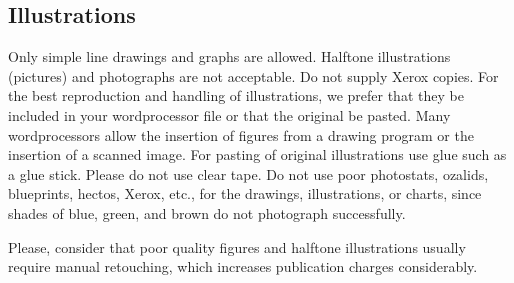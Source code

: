 \subsection{Illustrations}
Only simple line drawings and graphs are allowed.
Halftone illustrations (pictures) and photographs
are not acceptable. Do not supply Xerox copies.
For the best reproduction and handling of illustrations, we prefer
that they be included in your wordprocessor file or that the
original be pasted.  Many wordprocessors allow the insertion
of figures from a drawing program or the insertion of a
scanned image.  For pasting of original illustrations use glue
such as a glue stick.  Please do not use clear tape.  Do not
use poor photostats, ozalids, blueprints, hectos, Xerox, etc.,
for the drawings, illustrations, or charts, since shades of
blue, green, and brown do not photograph successfully.

Please, consider that poor quality figures
and halftone illustrations usually
require manual retouching,
which increases publication charges considerably.

